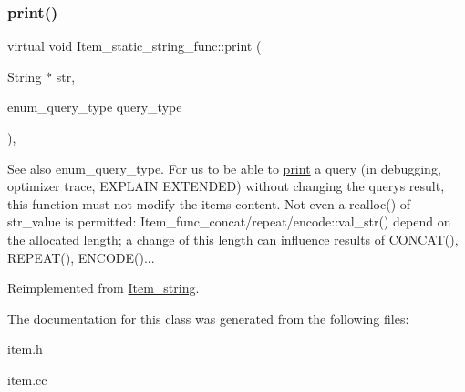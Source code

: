 \subsubsection{\texorpdfstring{print()}{print()}}
{\footnotesize\ttfamily virtual void Item\+\_\+static\+\_\+string\+\_\+func\+::print (\begin{DoxyParamCaption}\item[{String $\ast$}]{str,  }\item[{enum\+\_\+query\+\_\+type}]{query\+\_\+type }\end{DoxyParamCaption})\hspace{0.3cm}{\ttfamily [inline]}, {\ttfamily [virtual]}}

\begin{DoxySeeAlso}{See also}
enum\+\_\+query\+\_\+type. For us to be able to \mbox{\hyperlink{classItem__static__string__func_a592a40880113216f223f6c484622ac0d}{print}} a query (in debugging, optimizer trace, E\+X\+P\+L\+A\+IN E\+X\+T\+E\+N\+D\+ED) without changing the query\textquotesingle{}s result, this function must not modify the item\textquotesingle{}s content. Not even a realloc() of str\+\_\+value is permitted\+: Item\+\_\+func\+\_\+concat/repeat/encode\+::val\+\_\+str() depend on the allocated length; a change of this length can influence results of C\+O\+N\+C\+A\+T(), R\+E\+P\+E\+A\+T(), E\+N\+C\+O\+D\+E()... 
\end{DoxySeeAlso}


Reimplemented from \mbox{\hyperlink{classItem__string_a4d6fccdca40394df6239ca7dfbb9bb09}{Item\+\_\+string}}.



The documentation for this class was generated from the following files\+:\begin{DoxyCompactItemize}
\item 
item.\+h\item 
item.\+cc\end{DoxyCompactItemize}
